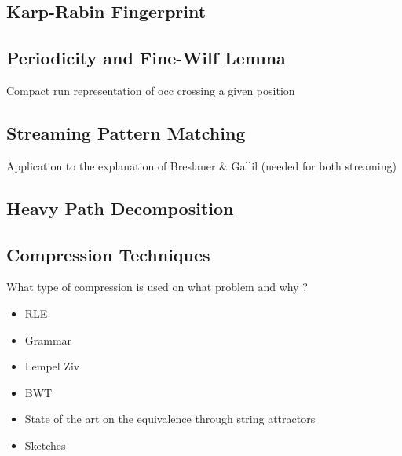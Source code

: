 


\subsection{Karp-Rabin Fingerprint}

\subsection{Periodicity and Fine-Wilf Lemma}
Compact run representation of occ crossing a given position

\subsection{Streaming Pattern Matching}
Application to the explanation of Breslauer \& Gallil (needed for both streaming)

\subsection{Heavy Path Decomposition}


\subsection{Compression Techniques}
What type of compression is used on what problem and why ?
\begin{itemize}
\item RLE
\item Grammar
\item Lempel Ziv
\item BWT
\item State of the art on the equivalence through string attractors
\item Sketches
\end{itemize}